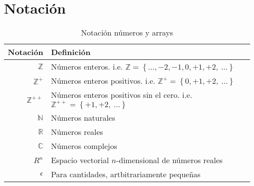 \chapter*{Notación}



\begin{table}[H]
    \begin{center}
        \begin{tabularx}{\textwidth}{|r|X|}
            \hline
            \textbf{Notación}   & \textbf{Definición}                                                                                               \\
            \hline
            $ \mathbb{Z} $      & Números enteros. i.e. \scriptsize{${ \mathbb{Z}  = \left\{ \ldots, -2, -1, 0, +1, +2,~\ldots \right\} }$}         \\
            $ \mathbb{Z}^{+} $  & Números enteros positivos. i.e. \scriptsize{${ \mathbb{Z}^{+}  = \left\{ 0, +1, +2,~\ldots \right\} }$}           \\
            $ \mathbb{Z}^{++} $ & Números enteros positivos sin el cero. i.e. \scriptsize{${ \mathbb{Z}^{++}  = \left\{ +1, +2,~\ldots \right\} }$} \\
            $ \mathbb{N} $      & Números naturales                                                                                                 \\
            $ \mathbb{R} $      & Números reales                                                                                                    \\
            $ \mathbb{C} $      & Números complejos                                                                                                 \\
            $ R^{n} $           & Espacio vectorial $n$-dimensional de números reales                                                               \\
            $ \epsilon $        & Para cantidades, artbitrariamente pequeñas                                                                        \\
            \hline
        \end{tabularx}
        \caption{Notación números y arrays}
        \label{tab:notation-part-2}
    \end{center}
\end{table}


